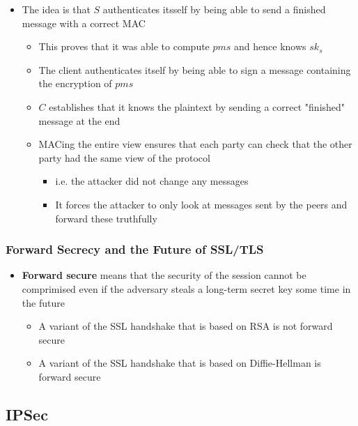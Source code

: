 \documentclass[11pt]{article}
\begin{document}
\begin{itemize}
\item The idea is that \(S\) authenticates itsself by being able to send a finished message with a correct MAC
\begin{itemize}
\item This proves that it was able to compute \(pms\) and hence knows \(sk_s\)
\item The client authenticates itself by being able to sign a message containing the encryption of \(pms\)
\item \(C\) establishes that it knows the plaintext by sending a correct "finished" message at the end
\item MACing the entire view ensures that each party can check that the other party had the same view of the protocol
\begin{itemize}
\item i.e. the attacker did not change any messages
\item It forces the attacker to only look at messages sent by the peers and forward these truthfully
\end{itemize}
\end{itemize}
\end{itemize}

\subsubsection{Forward Secrecy and the Future of SSL/TLS}
\label{sec:orgd8470ea}
\begin{itemize}
\item \textbf{Forward secure} means that the security of the session cannot be comprimised even if the adversary steals a long-term secret key some time in the future
\begin{itemize}
\item A variant of the SSL handshake that is based on RSA is not forward secure
\item A variant of the SSL handshake that is based on Diffie-Hellman is forward secure
\end{itemize}
\end{itemize}

\subsection{IPSec}
\label{sec:orgbbd5572}
\end{document}
